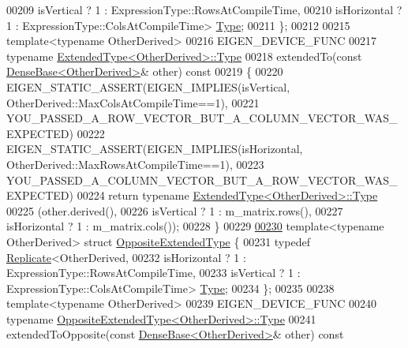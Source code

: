 \begin{DoxyCode}
00209                         isVertical   ? 1 : ExpressionType::RowsAtCompileTime,
00210                         isHorizontal ? 1 : ExpressionType::ColsAtCompileTime> 
      \hyperlink{group___core___module_class_eigen_1_1_replicate}{Type};
00211     \};
00212 
00215     \textcolor{keyword}{template}<\textcolor{keyword}{typename} OtherDerived>
00216     EIGEN\_DEVICE\_FUNC
00217     \textcolor{keyword}{typename} \hyperlink{group___core___module_class_eigen_1_1_replicate}{ExtendedType<OtherDerived>::Type}
00218     extendedTo(\textcolor{keyword}{const} \hyperlink{group___core___module_class_eigen_1_1_dense_base}{DenseBase<OtherDerived>}& other)\textcolor{keyword}{ const}
00219 \textcolor{keyword}{    }\{
00220       EIGEN\_STATIC\_ASSERT(EIGEN\_IMPLIES(isVertical, OtherDerived::MaxColsAtCompileTime==1),
00221                           YOU\_PASSED\_A\_ROW\_VECTOR\_BUT\_A\_COLUMN\_VECTOR\_WAS\_EXPECTED)
00222       EIGEN\_STATIC\_ASSERT(EIGEN\_IMPLIES(isHorizontal, OtherDerived::MaxRowsAtCompileTime==1),
00223                           YOU\_PASSED\_A\_COLUMN\_VECTOR\_BUT\_A\_ROW\_VECTOR\_WAS\_EXPECTED)
00224       \textcolor{keywordflow}{return} \textcolor{keyword}{typename} \hyperlink{group___core___module_class_eigen_1_1_replicate}{ExtendedType<OtherDerived>::Type}
00225                       (other.derived(),
00226                        isVertical   ? 1 : m\_matrix.rows(),
00227                        isHorizontal ? 1 : m\_matrix.cols());
00228     \}
00229 
\hyperlink{struct_eigen_1_1_vectorwise_op_1_1_opposite_extended_type}{00230}     \textcolor{keyword}{template}<\textcolor{keyword}{typename} OtherDerived> \textcolor{keyword}{struct }\hyperlink{struct_eigen_1_1_vectorwise_op_1_1_opposite_extended_type}{OppositeExtendedType} \{
00231       \textcolor{keyword}{typedef} \hyperlink{group___core___module_class_eigen_1_1_replicate}{Replicate}<OtherDerived,
00232                         isHorizontal ? 1 : ExpressionType::RowsAtCompileTime,
00233                         isVertical   ? 1 : ExpressionType::ColsAtCompileTime> 
      \hyperlink{group___core___module_class_eigen_1_1_replicate}{Type};
00234     \};
00235 
00238     \textcolor{keyword}{template}<\textcolor{keyword}{typename} OtherDerived>
00239     EIGEN\_DEVICE\_FUNC
00240     \textcolor{keyword}{typename} \hyperlink{group___core___module_class_eigen_1_1_replicate}{OppositeExtendedType<OtherDerived>::Type}
00241     extendedToOpposite(\textcolor{keyword}{const} \hyperlink{group___core___module_class_eigen_1_1_dense_base}{DenseBase<OtherDerived>}& other)\textcolor{keyword}{ const}

\end{DoxyCode}
